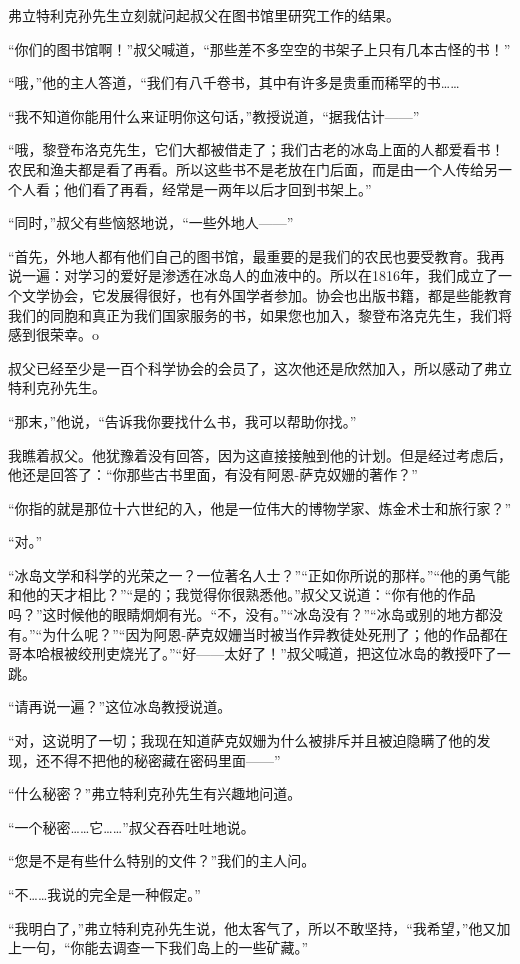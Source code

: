 \documentclass[10pt]{book}
\begin{document}
弗立特利克孙先生立刻就问起叔父在图书馆里研究工作的结果。

“你们的图书馆啊！”叔父喊道，“那些差不多空空的书架子上只有几本古怪的书！”

“哦，”他的主人答道，“我们有八千卷书，其中有许多是贵重而稀罕的书……

“我不知道你能用什么来证明你这句话，”教授说道，“据我估计——”

“哦，黎登布洛克先生，它们大都被借走了；我们古老的冰岛上面的人都爱看书！农民和渔夫都是看了再看。所以这些书不是老放在门后面，而是由一个人传给另一个人看；他们看了再看，经常是一两年以后才回到书架上。”

“同时，”叔父有些恼怒地说，“一些外地人——”

“首先，外地人都有他们自己的图书馆，最重要的是我们的农民也要受教育。我再说一遍：对学习的爱好是渗透在冰岛人的血液中的。所以在1816年，我们成立了一个文学协会，它发展得很好，也有外国学者参加。协会也出版书籍，都是些能教育我们的同胞和真正为我们国家服务的书，如果您也加入，黎登布洛克先生，我们将感到很荣幸。o

叔父已经至少是一百个科学协会的会员了，这次他还是欣然加入，所以感动了弗立特利克孙先生。

“那末，”他说，“告诉我你要找什么书，我可以帮助你找。”

我瞧着叔父。他犹豫着没有回答，因为这直接接触到他的计划。但是经过考虑后，他还是回答了：“你那些古书里面，有没有阿恩-萨克奴姗的著作？”

“你指的就是那位十六世纪的入，他是一位伟大的博物学家、炼金术士和旅行家？”

“对。”

“冰岛文学和科学的光荣之一？一位著名人士？”“正如你所说的那样。”“他的勇气能和他的天才相比？”“是的；我觉得你很熟悉他。”叔父又说道：“你有他的作品吗？”这时候他的眼睛炯炯有光。“不，没有。”“冰岛没有？”“冰岛或别的地方都没有。”“为什么呢？”“因为阿恩-萨克奴姗当时被当作异教徒处死刑了；他的作品都在哥本哈根被绞刑吏烧光了。”“好——太好了！”叔父喊道，把这位冰岛的教授吓了一跳。

“请再说一遍？”这位冰岛教授说道。

“对，这说明了一切；我现在知道萨克奴姗为什么被排斥并且被迫隐瞒了他的发现，还不得不把他的秘密藏在密码里面——”

“什么秘密？”弗立特利克孙先生有兴趣地问道。

“一个秘密……它……”叔父吞吞吐吐地说。

“您是不是有些什么特别的文件？”我们的主人问。

“不……我说的完全是一种假定。”

“我明白了，”弗立特利克孙先生说，他太客气了，所以不敢坚持，“我希望，”他又加上一句，“你能去调查一下我们岛上的一些矿藏。”
\end{document}
